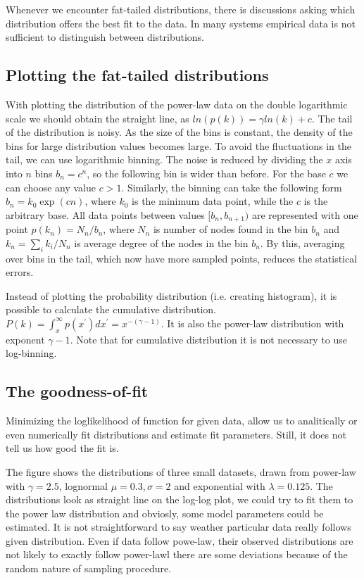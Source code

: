 Whenever we encounter fat-tailed distributions, there is discussions asking which distribution offers the best fit to the data. In many systems empirical data is not sufficient to distinguish between distributions. 

\subsection{Plotting the fat-tailed distributions}

With plotting the distribution of the power-law data on the double logarithmic scale we should obtain the straight line, as $ln(p(k)) = \gamma ln(k) + c$. The tail of the distribution is noisy. As the size of the bins is constant, the density of the bins for large distribution values becomes large. To avoid the fluctuations in the tail, we can use logarithmic binning. The noise is reduced by dividing the $x$ axis into $n$ bins $b_n = c^n$, so the following bin is wider than before. For the base $c$ we can choose any value $c>1$. Similarly, the binning can take the following form $b_n = k_0\exp{(cn)}$, where $k_0$ is the minimum data point, while the $c$ is the arbitrary base. All data points between values $[b_n, b_{n+1})$ are represented with one point $p(k_n) = N_n/b_n$, where $N_n$ is number of nodes found in the bin $b_n$ and $k_n = \sum_i k_i / N_n$ is average degree of the nodes in the bin $b_n$. By this, averaging over bins in the tail, which now have more sampled points, reduces the statistical errors.

Instead of plotting the probability distribution (i.e. creating histogram), it is possible to calculate the cumulative distribution. $P(k) = \int_{x}^{\infty} p(x^{'}) dx^{'} = x^{-(\gamma-1)}$. It is also the power-law distribution with exponent $\gamma-1$. Note that for cumulative distribution it is not necessary to use log-binning. 


\subsection{The goodness-of-fit}

Minimizing the loglikelihood of function for given data, allow us to analitically or even numerically fit distributions and estimate fit parameters. Still, it does not tell us how good the fit is. 

The figure shows the distributions of three small datasets, drawn from power-law with $\gamma=2.5$, lognormal $\mu=0.3, \sigma=2$ and exponential with $\lambda=0.125$. The distributions look as straight line on the log-log plot, we could try to fit them to the power law distribution and obviosly, some model parameters could be estimated. It is not straightforward to say weather particular data really follows given distribution. Even if data follow powe-law, their observed distributions are not likely to exactly follow power-lawl there are some deviations because of the random nature of sampling procedure. 

